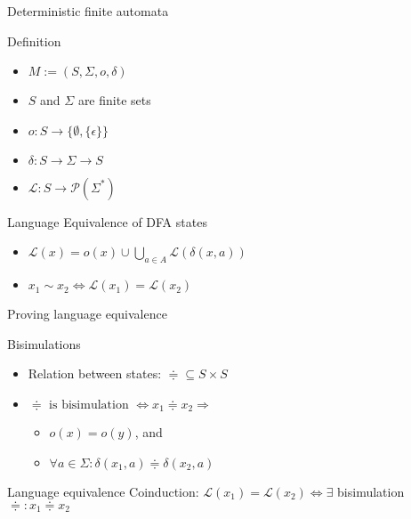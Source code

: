\begin{frame}{Deterministic finite automata}
  \begin{block}{Definition}
    \begin{itemize}
      \item $M := (S, \Sigma, o, \delta)$
      \item $S$ and $\Sigma$ are finite sets
      \item $o : S \to \{\emptyset, \{\epsilon\} \}$
      \item $\delta : S \to \Sigma \to S$
      \item $\mathcal{L} : S \to \mathcal{P}(\Sigma^\ast)$
    \end{itemize}
  \end{block}

  \begin{block}{Language Equivalence of DFA states}
    \begin{itemize}
      \item $\mathcal{L}(x) = o(x) \cup \bigcup_{a \in A}{\mathcal{L}({\delta(x, a)})}$
      \item $x_1 \sim x_2 \Leftrightarrow \mathcal{L}(x_1) = \mathcal{L}(x_2)$
    \end{itemize}
  \end{block}
\end{frame}

\begin{frame}{Proving language equivalence}
  \begin{block}{Bisimulations}
    \begin{itemize}
      \item Relation between states: $\doteqdot \subseteq S \times S$
      \item $\doteqdot \text{ is bisimulation } \Leftrightarrow x_1 \doteqdot x_2 \Rightarrow $
        \begin{itemize}
          \item $o(x) = o(y)$, and
          \item $\forall a \in \Sigma: \delta(x_1, a) \doteqdot \delta(x_2, a)$
        \end{itemize}
    \end{itemize}
   \end{block}

   \begin{block}{Language equivalence}
     Coinduction:
     $\mathcal{L}(x_1) = \mathcal{L}(x_2) \Leftrightarrow \exists$ bisimulation $\doteqdot: x_1 \doteqdot x_2$
   \end{block}
\end{frame}

